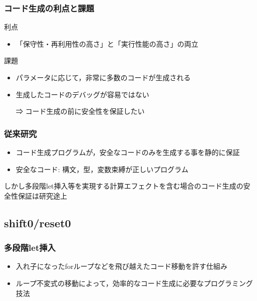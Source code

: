\documentclass[dvipdfmx,cjk,xcolor=dvipsnames,envcountsect,notheorems,12pt]{beamer}
\theoremstyle{definition}
\begin{document}
\begin{frame}
  \frametitle{コード生成の利点と課題}

  利点
  \begin{itemize}
  \item \alert{「保守性・再利用性の高さ」}と\alert{「実行性能の高さ」}の両立
  \end{itemize}

  \pause

  課題
  \begin{itemize}
  \item パラメータに応じて，非常に多数のコードが生成される
  \item 生成したコードのデバッグが容易ではない
  \item [⇒] \alert{コード生成の前に安全性を保証}したい
  \end{itemize}
\end{frame}

\begin{frame}
  \frametitle{従来研究}
  \begin{itemize}
  \item コード生成プログラムが，安全なコードのみを生成する事を静的に保証
  \item 安全なコード: 構文，型，変数束縛が正しいプログラム
  \end{itemize}

  \pause

  しかし\alert{多段階let挿入}等を実現する\alert{計算エフェクト}を含む場合のコード生成の安全性保証は研究途上
\end{frame}

\subsection{shift0/reset0}

\begin{frame}
  \frametitle{多段階let挿入}

  \begin{itemize}
  \item 入れ子になったforループなどを飛び越えた\alert{コード移動}を許す仕組み
  \item ループ不変式の移動によって，\alert{効率的なコード生成}に必要なプログラミング技法
  \end{itemize}
\end{frame}
\end{document}
